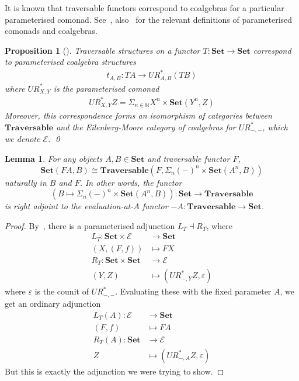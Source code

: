 \documentclass[11pt,letterpaper]{article}
\theoremstyle{plain}
\newtheorem{proposition}[theorem]{Proposition}
\newtheorem{lemma}[theorem]{Lemma}
\theoremstyle{definition}
\newcommand{\E}{\mathscr{E}}
\newcommand{\bN}{\mathbb{N}}
\newcommand{\Set}{\mathbf{Set}}
\newcommand{\Traversable}{\mathbf{Traversable}}
\begin{document}
It is known that traversable functors correspond to coalgebras for a particular parameterised comonad. See~{\cite[Definitions 4.1 and 4.2]{SecondOrderFunctionals}}, also~\cite{AlgebrasForParameterisedMonads} for the relevant definitions of parameterised comonads and coalgebras.

\begin{proposition}[{\cite[Theorem 4.10, Proposition 5.4]{SecondOrderFunctionals}}]
Traversable structures on a functor $T : \Set \to \Set$ correspond to parameterised coalgebra structures
\begin{align*}
t_{A, B} : TA \to UR^*_{A, B}(T B)
\end{align*}
where $UR^*_{X,Y}$ is the parameterised comonad
\begin{align*}
UR^*_{X, Y} Z = \Sigma_{n\in \bN} X^n \times \Set(Y^n,Z)
\end{align*}
Moreover, this correspondence forms an isomorphism of categories between $\Traversable$ and the Eilenberg-Moore category of coalgebras for $UR^*_{-, -}$, which we denote $\E$. \qed
\end{proposition}


\begin{lemma}
  For any objects $A, B \in \Set$ and traversable functor $F$, \[\Set(FA, B) \cong \Traversable(F, \Sigma_n {(-)}^n \times \Set(A^n,B))\]
naturally in $B$ and $F$. In other words, the functor \[(B \mapsto \Sigma_n {(-)}^n \times \Set(A^n,B)) : \Set \to \Traversable\] is right adjoint to the evaluation-at-$A$ functor $-A : \Traversable \to \Set$.
\end{lemma}
\begin{proof}
By~\cite[Proposition 6]{AlgebrasForParameterisedMonads}, there is a parameterised adjunction $L_T \dashv R_T$, where
\begin{align*}
L_T : \Set \times \E &\to \Set \\
(X, (F, f)) &\mapsto FX \\
R_T : \Set \times \Set &\to \E \\
(Y, Z) &\mapsto (UR^*_{-, Y} Z, \varepsilon)
\end{align*}
where $\varepsilon$ is the counit of $UR^*_{-, -}$. Evaluating these with the fixed parameter $A$, we get an ordinary adjunction
\begin{align*}
L_T(A) : \E &\to \Set \\
(F, f) &\mapsto FA \\
R_T(A) : \Set &\to \E \\
Z &\mapsto (UR^*_{-, A} Z, \varepsilon)
\end{align*}
But this is exactly the adjunction we were trying to show.
\end{proof}
\end{document}
